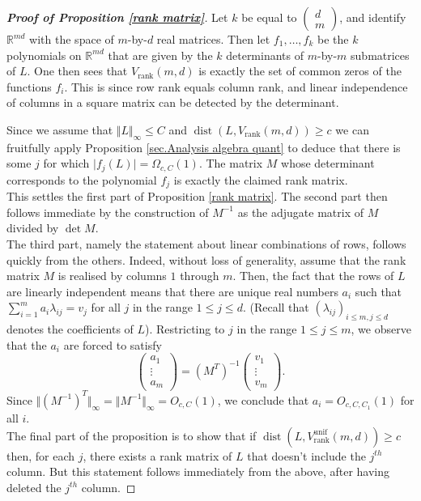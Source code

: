 \documentclass[12pt,a4paper,twoside,reqno]{amsart}
\newcommand{\rank}{\operatorname{rank}}
\newcommand{\dist}{\operatorname{dist}}
\newcommand{\unif}{\operatorname{unif}}
\numberwithin{equation}{section}
\begin{document}
\begin{proof}[\textbf{Proof of \emph{Proposition \ref{rank matrix}}}]
Let $k$ be equal to $\left(\begin{smallmatrix} d\\ m\end{smallmatrix}\right)$, and identify $\mathbb{R}^{md}$ with the space of $m$-by-$d$ real matrices. Then let $f_1,\dots,f_k$ be the $k$ polynomials on $\mathbb{R}^{md}$ that are given by the $k$ determinants of $m$-by-$m$ submatrices of $L$. One then sees that $V_{\rank}(m,d)$ is exactly the set of common zeros of the functions $f_i$. This is since row rank equals column rank, and linear independence of columns in a square matrix can be detected by the determinant. 

Since we assume that $\Vert L\Vert_\infty\leqslant C$ and $\operatorname{dist}(L,V_{\rank}(m,d))\geqslant c$ we can fruitfully apply Proposition \ref{sec.Analysis algebra quant} to deduce that there is some $j$ for which $\vert f_j(L)\vert= \Omega_{c,C}(1)$. The matrix $M$ whose determinant corresponds to the polynomial $f_j$ is exactly the claimed rank matrix. \\

This settles the first part of Proposition \ref{rank matrix}. The second part then follows immediate by the construction of $M^{-1}$ as the adjugate matrix of $M$ divided by $\det M$. \\

The third part, namely the statement about linear combinations of rows, follows quickly from the others. Indeed, without loss of generality, assume that the rank matrix $M$ is realised by columns $1$ through $m$. Then, the fact that the rows of $L$ are linearly independent means that there are unique real numbers $a_i$ such that $\sum\limits_{i=1}^m a_i \lambda_{ij} = v_{j}$ for all $j$ in the range $1\leqslant j\leqslant d$. (Recall that $(\lambda_{ij})_{i\leqslant m,j\leqslant d}$ denotes the coefficients of $L$). Restricting to $j$ in the range $1\leqslant j \leqslant m$, we observe that the $a_i$ are forced to satisfy $$\left(\begin{matrix} 
a_1 \\ 
\vdots \\
a_m
\end{matrix}\right)
 = (M^{T})^{-1}\left(\begin{matrix} 
v_1 \\ 
\vdots \\
v_m
\end{matrix}\right).$$ Since $\Vert (M^{-1})^T\Vert_{\infty} = \Vert M^{-1}\Vert_{\infty} = O_{c,C}(1)$, we conclude that $a_i = O_{c,C,C_1}(1)$ for all $i$. \\

The final part of the proposition is to show that if $\dist(L,V_{\rank}^{\unif}(m,d))\geqslant c$ then, for each $j$, there exists a rank matrix of $L$ that doesn't include the $j^{th}$ column. But this statement follows immediately from the above, after having deleted the $j^{th}$ column.  
\end{proof}
\end{document}
